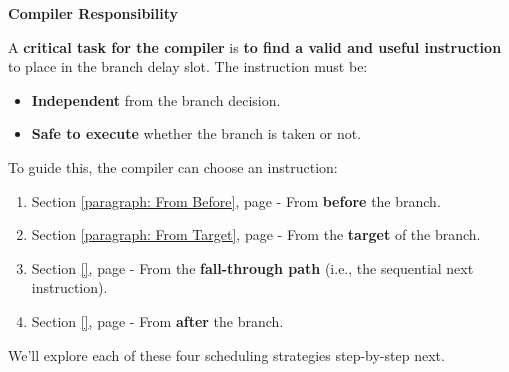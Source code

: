 \highspace
\begin{flushleft}
    \textcolor{Red2}{ \textbf{Compiler Responsibility}}
\end{flushleft}
A \textbf{critical task for the compiler} is \textbf{to find a valid and useful instruction} to place in the branch delay slot. The instruction must be:
\begin{itemize}
    \item \textbf{Independent} from the branch decision.
    \item \textbf{Safe to execute} whether the branch is taken or not.
\end{itemize}
To guide this, the compiler can choose an instruction:
\begin{enumerate}
    \item Section \ref{paragraph: From Before}, page \pageref{paragraph: From Before} - From \textbf{before} the branch.
    \item Section \ref{paragraph: From Target}, page \pageref{paragraph: From Target} - From the \textbf{target} of the branch.
    \item Section \ref{}, page \pageref{} - From the \textbf{fall-through path} (i.e., the sequential next instruction).
    \item Section \ref{}, page \pageref{} - From \textbf{after} the branch.
\end{enumerate}
We'll explore each of these four scheduling strategies step-by-step next.